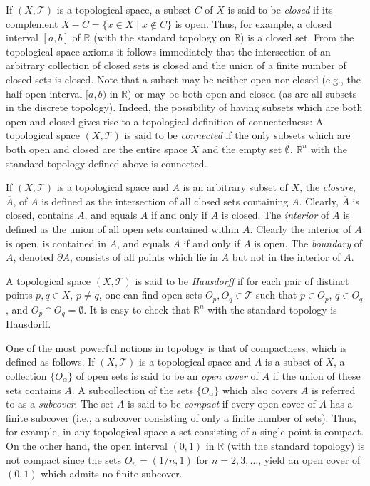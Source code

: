 If \((X,\mathcal T)\) is a topological space, a subset \(C\) of \(X\) is said to be
\emph{closed} if its complement
\(X-C=\{x\in X\mid x\notin C\}\) is open. Thus, for example, a closed interval
\([a,b]\) of \(\mathbb R\) (with the standard topology on \(\mathbb R\)) is a closed
set. From the topological space axioms it follows immediately that the intersection
of an arbitrary collection of closed sets is closed and the union of a finite number of
closed sets is closed. Note that a subset may be neither open nor closed (e.g., the
half-open interval \([a,b)\) in \(\mathbb R\)) or may be both open and closed (as are
all subsets in the discrete topology). Indeed, the possibility of having subsets which
are both open and closed gives rise to a topological definition of connectedness: A
topological space \((X,\mathcal T)\) is said to be \emph{connected} if the only
subsets which are both open and closed are the entire space \(X\) and the empty set
\(\emptyset\). \(\mathbb R^n\) with the standard topology defined above is connected.

If \((X,\mathcal T)\) is a topological space and \(A\) is an arbitrary subset of \(X\),
the \emph{closure}, \(\overline A\), of \(A\) is defined as the intersection of all
closed sets containing \(A\). Clearly, \(\overline A\) is closed, contains \(A\), and
equals \(A\) if and only if \(A\) is closed. The \emph{interior} of \(A\) is defined as
the union of all open sets contained within \(A\). Clearly the interior of \(A\) is
open, is contained in \(A\), and equals \(A\) if and only if \(A\) is open. The
\emph{boundary} of \(A\), denoted \(\partial A\), consists of all points which lie in
\(\overline A\) but not in the interior of \(A\).

A topological space \((X,\mathcal T)\) is said to be \emph{Hausdorff} if for each pair
of distinct points \(p,q\in X\), \(p\ne q\), one can find open sets
\(O_p,O_q\in\mathcal T\) such that \(p\in O_p\), \(q\in O_q\), and
\(O_p\cap O_q=\emptyset\). It is easy to check that \(\mathbb R^n\) with the standard
topology is Hausdorff.

One of the most powerful notions in topology is that of compactness, which is
defined as follows. If \((X,\mathcal T)\) is a topological space and \(A\) is a subset
of \(X\), a collection \(\{O_\alpha\}\) of open sets is said to be an \emph{open cover}
of \(A\) if the union of these sets contains \(A\). A subcollection of the sets
\(\{O_\alpha\}\) which also covers \(A\) is referred to as a \emph{subcover}. The set
\(A\) is said to be \emph{compact} if every open cover of \(A\) has a finite subcover
(i.e., a subcover consisting of only a finite number of sets). Thus, for example, in
any topological space a set consisting of a single point is compact. On the other
hand, the open interval \((0,1)\) in \(\mathbb R\) (with the standard topology) is not
compact since the sets \(O_n=(1/n,1)\) for \(n=2,3,\ldots\), yield an open cover of
\((0,1)\) which admits no finite subcover.

